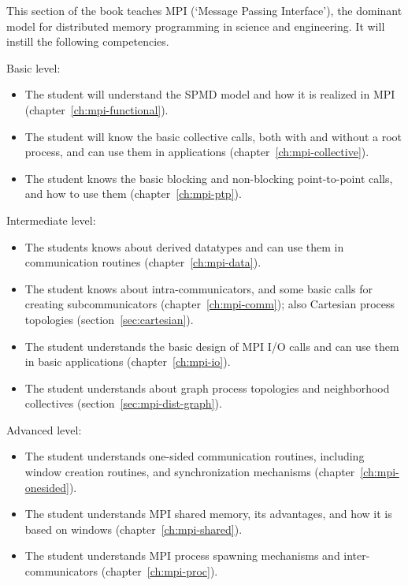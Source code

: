 
This section of the book teaches MPI (`Message Passing Interface'),
the dominant model for distributed memory programming in science and engineering.
It will instill the following competencies.

Basic level:
\begin{itemize}
\item The student will understand the \acs{SPMD} model
  and how it is realized in MPI (chapter~\ref{ch:mpi-functional}).
\item The student will know the basic collective calls,
  both with and without a root process,
  and can use them in applications
  (chapter~\ref{ch:mpi-collective}).
\item The student knows the basic blocking and non-blocking
  point-to-point calls,
  and how to use them
  (chapter~\ref{ch:mpi-ptp}).
\end{itemize}

Intermediate level:
\begin{itemize}
\item The students knows about derived datatypes and can use them
  in communication routines
  (chapter~\ref{ch:mpi-data}).
\item The student knows about intra-communicators,
  and some basic calls for creating subcommunicators
  (chapter~\ref{ch:mpi-comm});
  also Cartesian process topologies
  (section~\ref{sec:cartesian}).
\item The student understands the basic design of MPI I/O calls
  and can use them in basic applications
  (chapter~\ref{ch:mpi-io}).
\item The student understands about graph process topologies
  and neighborhood collectives
  (section~\ref{sec:mpi-dist-graph}).
\end{itemize}

Advanced level:
\begin{itemize}
\item The student understands one-sided communication routines,
  including window creation routines, and synchronization mechanisms
  (chapter~\ref{ch:mpi-onesided}).
\item The student understands MPI shared memory, its advantages,
  and how it is based on windows
  (chapter~\ref{ch:mpi-shared}).
\item The student understands MPI process spawning mechanisms
  and inter-communicators
  (chapter~\ref{ch:mpi-proc}).
\end{itemize}
